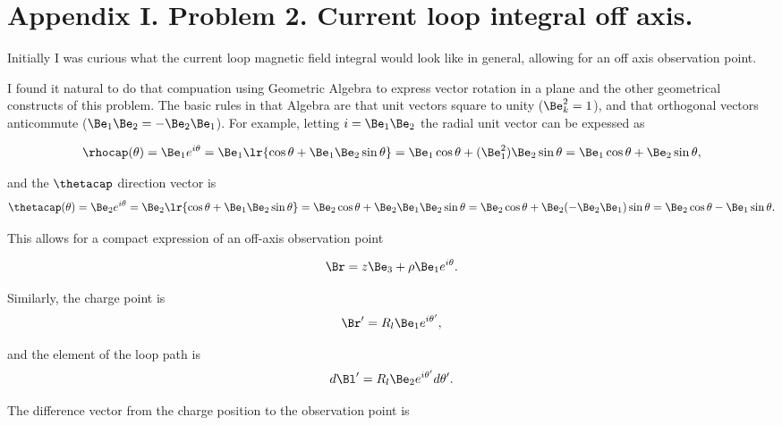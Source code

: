 \section{Appendix I.  Problem 2. Current loop integral off axis.}

Initially I was curious what the current loop magnetic field integral would look like in general, allowing for an off axis observation point.

I found it natural to do that compuation using Geometric Algebra to express vector rotation in a plane and the other geometrical constructs of this problem.  The basic rules in that Algebra are that unit vectors square to unity (\(\Be_k^2 = 1 \)), and that orthogonal vectors anticommute (\( \Be_1 \Be_2 = -\Be_2 \Be_1 \)).  For example, letting \( i = \Be_1 \Be_2 \) the radial unit vector can be expessed as

\begin{dmath}\label{eqn:emtProblemSet3Problem2:160}
\rhocap(\theta)
=
\Be_1 e^{i \theta}
= \Be_1 \lr{ \cos\theta + \Be_1 \Be_2 \sin\theta } 
= \Be_1 \cos\theta + (\Be_1^2) \Be_2 \sin\theta
= \Be_1 \cos\theta + \Be_2 \sin\theta,
\end{dmath}

and the \( \thetacap \) direction vector is
\begin{dmath}\label{eqn:emtProblemSet3Appendix:n}
\thetacap(\theta)
=
\Be_2 e^{i \theta}
= \Be_2 \lr{ \cos\theta + \Be_1 \Be_2 \sin\theta } 
= \Be_2 \cos\theta + \Be_2 \Be_1 \Be_2 \sin\theta
= \Be_2 \cos\theta + \Be_2 (-\Be_2 \Be_1) \sin\theta
= \Be_2 \cos\theta - \Be_1 \sin\theta.
\end{dmath}

This allows for a compact expression of an off-axis observation point

\begin{dmath}\label{eqn:emtProblemSet3Problem2:60}
\Br = z \Be_3 + \rho \Be_1 e^{i\theta}.
\end{dmath}

Similarly, the charge point is
\begin{dmath}\label{eqn:emtProblemSet3Problem2:80}
\Br' = R_l \Be_1 e^{i \theta'},
\end{dmath}

and the element of the loop path is
\begin{dmath}\label{eqn:emtProblemSet3Problem2:100}
d\Bl' = R_l \Be_2 e^{i\theta'} d\theta'.
\end{dmath}

The difference vector from the charge position to the observation point is

